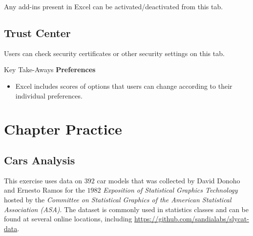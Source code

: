 Any add-ins present in Excel can be activated/deactivated from this tab.

\subsection{Trust Center}

Users can check security certificates or other security settings on this tab.

\begin{center}
	\begin{tkwbox}{Key Take-Aways}
		\textbf{Preferences}
		\\
		\begin{itemize}
			\setlength{\itemsep}{0pt}
			\setlength{\parskip}{0pt}
			\setlength{\parsep}{0pt}
			
			\item Excel includes scores of options that users can change according to their individual preferences.
			
		\end{itemize}
	\end{tkwbox}
\end{center}

\section{Chapter Practice}

\subsection{Cars Analysis}

This exercise uses data on $ 392 $ car models that was collected by David Donoho and Ernesto Ramos for the $ 1982 $ \textit{Exposition of Statistical Graphics Technology} hosted by the \textit{Committee on Statistical Graphics of the American Statistical Association (ASA)}. The dataset is commonly used in statistics classes and can be found at several online locations, including \url{https://github.com/sandialabs/slycat-data}.

